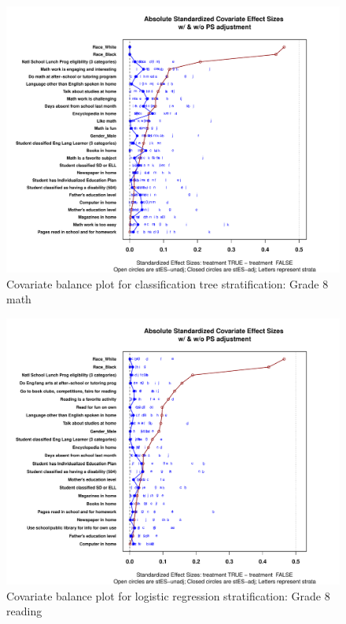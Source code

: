 \begin{figure}
\begin{center}
\includegraphics[width=\textwidth]{../Figures2009/g8math-tree-balance.pdf}
\caption{Covariate balance plot for classification tree stratification: Grade 8 math}
\end{center}
\end{figure}

\begin{figure}[h!]
\begin{center}
\includegraphics[width=\textwidth]{../Figures2009/g8read-lr-balance.pdf}
\caption{Covariate balance plot for logistic regression stratification: Grade 8 reading}
\end{center}
\end{figure}

